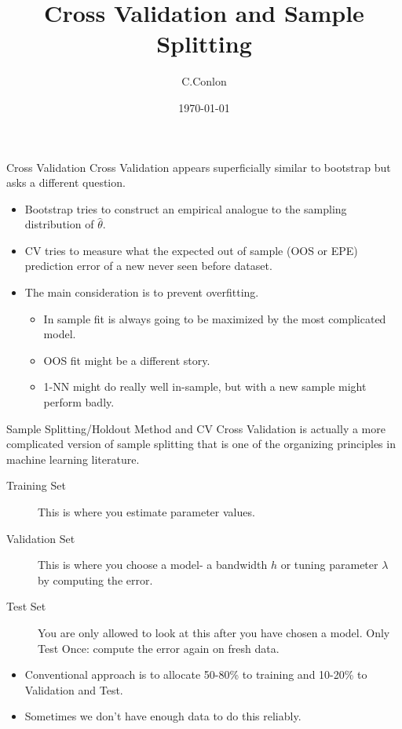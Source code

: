 

\title [Bootstrap]{ Cross Validation and Sample Splitting}
\author{C.Conlon}
\date{\today}


\begin{frame}
\titlepage
\end{frame}



\begin{frame}{Cross Validation}
Cross Validation appears superficially similar to bootstrap but asks a different question.
\begin{itemize}
\item Bootstrap tries to construct an empirical analogue to the sampling distribution of $\hat{\theta}$.
\item CV tries to measure what the expected out of sample (OOS or EPE) prediction error of a new never seen before dataset.
\item The main consideration is to prevent \alert{overfitting}.
\begin{itemize}
\item In sample fit is always going to be maximized by the most complicated model.
\item OOS fit might be a different story.
\item 1-NN might do really well in-sample, but with a new sample might perform badly.
\end{itemize}
\end{itemize}
\end{frame}

\begin{frame}{Sample Splitting/Holdout Method and CV}
Cross Validation is actually a more complicated version of \alert{sample splitting} that is one of the organizing principles in machine learning literature.

\begin{description}
\item[Training Set] This is where you estimate parameter values.
\item[Validation Set] This is where you choose a model- a bandwidth $h$ or tuning parameter $\lambda$ by computing the error.
\item[Test Set] You are only allowed to look at this after you have chosen a model. \alert{Only Test Once}: compute the error again on fresh data.
\end{description}
\begin{itemize}
\item Conventional approach is to allocate 50-80\% to training and 10-20\% to Validation and Test.
\item Sometimes we don't have enough data to do this reliably.
\end{itemize}
\end{frame}

